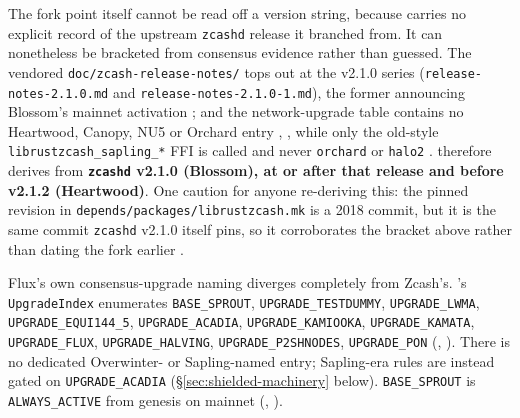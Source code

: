 The fork point itself cannot be read off a version string, because \fluxd carries no explicit
record of the upstream \texttt{zcashd} release it branched from. It can nonetheless be bracketed
from consensus evidence rather than guessed. The vendored \texttt{doc/\allowbreak{}zcash-release-notes/}
tops out at the v2.1.0 series (\texttt{release-notes-2.\allowbreak{}1.\allowbreak{}0.\allowbreak{}md} and
\texttt{release-\allowbreak{}notes-\allowbreak{}2.1.0-\allowbreak{}1.\allowbreak{}md}), the former announcing Blossom's mainnet activation
; and the network-upgrade
table contains no Heartwood, Canopy, NU5 or Orchard entry
, ,
while only the old-style \texttt{librustzcash\_sapling\_*} FFI is called and never
\texttt{orchard} or \texttt{halo2} . \Flux therefore derives
from \textbf{\texttt{zcashd} v2.1.0 (Blossom), at or after that release and before v2.1.2
(Heartwood)}. One caution for anyone re-deriving this: the pinned revision in
\texttt{depends/\allowbreak{}packages/\allowbreak{}librustzcash.\allowbreak{}mk} is a 2018 commit, but it is the same commit
\texttt{zcashd} v2.1.0 itself pins, so it corroborates the bracket above rather than dating the fork
earlier .

Flux's own consensus-upgrade naming diverges completely from Zcash's. \fluxd's \texttt{UpgradeIndex}
enumerates \texttt{BASE\_SPROUT}, \texttt{UPGRADE\_TESTDUMMY}, \texttt{UPGRADE\_LWMA},
\texttt{UPGRADE\_EQUI144\_5}, \texttt{UPGRADE\_ACADIA}, \texttt{UPGRADE\_KAMIOOKA},
\texttt{UPGRADE\_KAMATA}, \texttt{UPGRADE\_FLUX}, \texttt{UPGRADE\_HALVING},
\texttt{UPGRADE\_P2SHNODES}, \texttt{UPGRADE\_PON} (\shipped,
). There is no dedicated Overwinter- or Sapling-named
entry; Sapling-era rules are instead gated on \texttt{UPGRADE\_ACADIA} (\S\ref{sec:shielded-machinery}
below). \texttt{BASE\_SPROUT} is \texttt{ALWAYS\_ACTIVE} from genesis on mainnet (\shipped,
).

